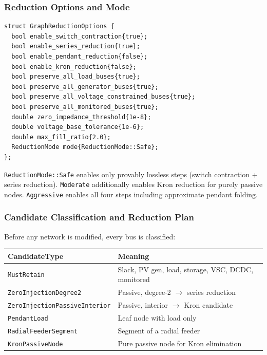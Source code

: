 \subsubsection{Reduction Options and Mode}

\begin{verbatim}
struct GraphReductionOptions {
  bool enable_switch_contraction{true};
  bool enable_series_reduction{true};
  bool enable_pendant_reduction{false};
  bool enable_kron_reduction{false};
  bool preserve_all_load_buses{true};
  bool preserve_all_generator_buses{true};
  bool preserve_all_voltage_constrained_buses{true};
  bool preserve_all_monitored_buses{true};
  double zero_impedance_threshold{1e-8};
  double voltage_base_tolerance{1e-6};
  double max_fill_ratio{2.0};
  ReductionMode mode{ReductionMode::Safe};
};
\end{verbatim}

\texttt{ReductionMode::Safe} enables only provably lossless steps (switch
contraction + series reduction).  \texttt{Moderate} additionally enables Kron
reduction for purely passive nodes.  \texttt{Aggressive} enables all four
steps including approximate pendant folding.

\subsubsection{Candidate Classification and Reduction Plan}

Before any network is modified, every bus is classified:

\begin{center}
\begin{tabular}{ll}
\hline\hline
\textbf{CandidateType} & \textbf{Meaning} \\
\hline
\texttt{MustRetain}                    & Slack, PV gen, load, storage, VSC, DCDC, monitored \\
\texttt{ZeroInjectionDegree2}          & Passive, degree-2 $\to$ series reduction \\
\texttt{ZeroInjectionPassiveInterior}  & Passive, interior $\to$ Kron candidate \\
\texttt{PendantLoad}                   & Leaf node with load only \\
\texttt{RadialFeederSegment}           & Segment of a radial feeder \\
\texttt{KronPassiveNode}               & Pure passive node for Kron elimination \\
\hline\hline
\end{tabular}
\end{center}

